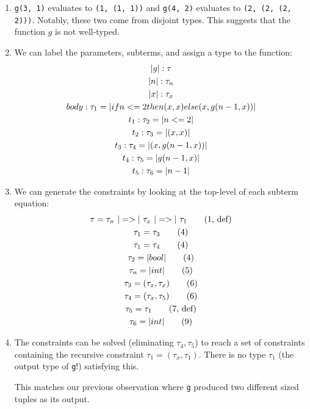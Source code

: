 \begin{exercise}{}
  \begin{solution}
    \begin{enumerate}
      \item \lstinline|g(3, 1)| evaluates to \lstinline|(1, (1, 1))| and
      \lstinline|g(4, 2)| evaluates to \lstinline|(2, (2, (2, 2)))|. Notably,
      these two come from disjoint types. This suggests that the function \(g\)
      is not well-typed.
      \item We can label the parameters, subterms, and assign a type to the
      function:
      \setcounter{equation}{0}
      \begin{gather}
        \lstinline|g|: \tau \\
        \lstinline|n|: \tau_n \\
        \lstinline|x|: \tau_x \\
        body: \tau_1 = \lstinline|if n <=  2 then (x, x)  else (x, g(n - 1, x))| \\
        t_1: \tau_2 = \lstinline|n <=  2| \\
        t_2: \tau_3 = \lstinline|(x, x)| \\
        t_3: \tau_4 = \lstinline|(x, g(n - 1, x))| \\
        t_4: \tau_5 = \lstinline|g(n - 1, x)| \\
        t_5: \tau_6 = \lstinline|n - 1|
      \end{gather}
      \item We can generate the constraints by looking at the top-level of each
      subterm equation:
      \begin{gather*}
        \tau = \tau_n ~\ato~ \tau_x ~\ato~ \tau_1 \tag{1, def} \\
        \tau_1 = \tau_3 \tag{4} \\
        \tau_1 = \tau_4 \tag{4} \\
        \tau_2 = \abool \tag{4} \\
        \tau_n = \aint \tag{5} \\
        \tau_3 = (\tau_x, \tau_x) \tag{6} \\
        \tau_4 = (\tau_x, \tau_5) \tag{6} \\
        \tau_5 = \tau_1 \tag{7, def} \\
        \tau_6 = \aint \tag{9}
      \end{gather*}
      \item The constraints can be solved (eliminating \(\tau_4, \tau_5\)) to
      reach a set of constraints containing the recursive constraint \(\tau_1 =
      (\tau_x, \tau_1)\). There is no type \(\tau_1\) (the output type of
      \lstinline|g|!) satisfying this. 

      This matches our previous observation where \lstinline|g| produced two
      different sized tuples as its output. 
    \end{enumerate}
  \end{solution}
  
\end{exercise}